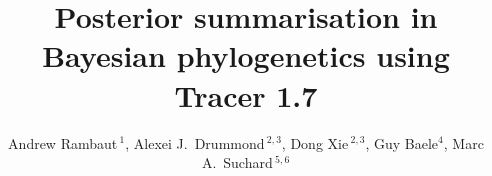 \documentclass{bioinfo_tracer}
\begin{document}

\title[Tracer]{Posterior summarisation in Bayesian phylogenetics using Tracer 1.7}

\author[Rambaut \textit{et~al.}]{
Andrew Rambaut\,$^{1}$,
Alexei J.~Drummond\,$^{2,3}$,
Dong Xie\,$^{2,3}$,
Guy Baele$^{4}$,
Marc A.~Suchard\,$^{5,6}$
}

\address{
$^{1}$Institute of Evolutionary Biology, University of Edinburgh, Edinburgh, UK \\
$^{2}$Department of Computer Science, University of Auckland, Auckland, NZ \\
$^{3}$Centre for Computational Evolution, University of Auckland, Auckland, NZ \\
$^{4}$Department of Microbiology and Immunology, Rega Institute, KU Leuven, Leuven, Belgium\\
$^{5}$Department of Human Genetics, University of California, Los Angeles, USA \\
$^{6}$Department of Biostatistics, University of California, Los Angeles, USA \\
}



\maketitle
\end{document}
